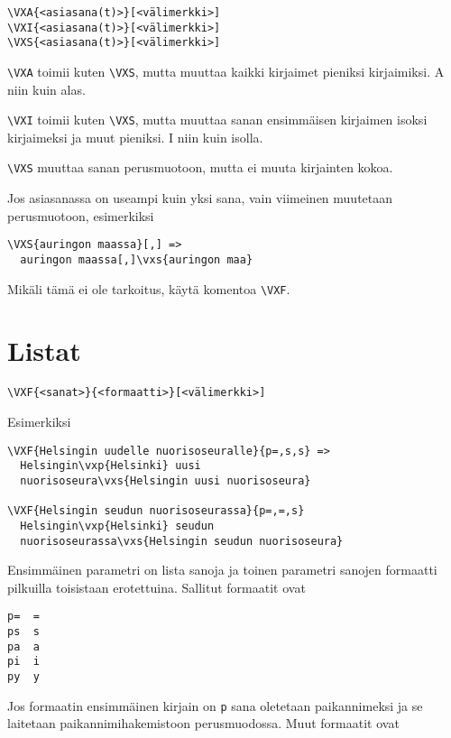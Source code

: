 \documentclass[12pt]{article}
\begin{document}
\begin{verbatim}
\VXA{<asiasana(t)>}[<välimerkki>]
\VXI{<asiasana(t)>}[<välimerkki>]
\VXS{<asiasana(t)>}[<välimerkki>]
\end{verbatim}

\verb=\VXA= toimii kuten \verb=\VXS=, mutta muuttaa kaikki kirjaimet
pieniksi kirjaimiksi. A niin kuin alas.

\verb=\VXI= toimii kuten \verb=\VXS=, mutta muuttaa sanan
ensimmäisen kirjaimen isoksi kirjaimeksi ja muut pieniksi.
I niin kuin isolla.

\verb=\VXS= muuttaa sanan perusmuotoon, mutta ei muuta kirjainten kokoa.

Jos asiasanassa on useampi kuin yksi sana, vain viimeinen muutetaan
perusmuotoon, esimerkiksi

\begin{verbatim}
\VXS{auringon maassa}[,] =>
  auringon maassa[,]\vxs{auringon maa}
\end{verbatim}

Mikäli tämä ei ole tarkoitus, käytä komentoa \verb=\VXF=.


\section*{Listat}

\begin{verbatim}
\VXF{<sanat>}{<formaatti>}[<välimerkki>]
\end{verbatim}

Esimerkiksi

\begin{verbatim}
\VXF{Helsingin uudelle nuorisoseuralle}{p=,s,s} =>
  Helsingin\vxp{Helsinki} uusi
  nuorisoseura\vxs{Helsingin uusi nuorisoseura}

\VXF{Helsingin seudun nuorisoseurassa}{p=,=,s}
  Helsingin\vxp{Helsinki} seudun
  nuorisoseurassa\vxs{Helsingin seudun nuorisoseura}
\end{verbatim}

Ensimmäinen parametri on lista sanoja ja toinen parametri sanojen
formaatti pilkuilla toisistaan erotettuina. Sallitut formaatit ovat

\begin{verbatim}
p=  =
ps  s
pa  a
pi  i
py  y
\end{verbatim}

Jos formaatin ensimmäinen kirjain on \verb=p= sana oletetaan
paikannimeksi ja se laitetaan paikannimihakemistoon perusmuodossa.
Muut formaatit ovat
\end{document}
